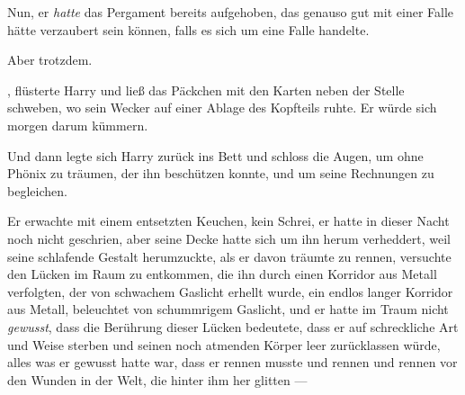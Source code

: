 Nun, er \emph{hatte} das Pergament bereits aufgehoben, das genauso gut mit einer Falle hätte verzaubert sein können, falls es sich um eine Falle handelte.

Aber trotzdem.

, flüsterte Harry und ließ das Päckchen mit den Karten neben der Stelle schweben, wo sein Wecker auf einer Ablage des Kopfteils ruhte. Er würde sich morgen darum kümmern.

Und dann legte sich Harry zurück ins Bett und schloss die Augen, um ohne Phönix zu träumen, der ihn beschützen konnte, und um seine Rechnungen zu begleichen.

\later

Er erwachte mit einem entsetzten Keuchen, kein Schrei, er hatte in dieser Nacht noch nicht geschrien, aber seine Decke hatte sich um ihn herum verheddert, weil seine schlafende Gestalt herumzuckte, als er davon träumte zu rennen, versuchte den Lücken im Raum zu entkommen, die ihn durch einen Korridor aus Metall verfolgten, der von schwachem Gaslicht erhellt wurde, ein endlos langer Korridor aus Metall, beleuchtet von schummrigem Gaslicht, und er hatte im Traum nicht \emph{gewusst}, dass die Berührung dieser Lücken bedeutete, dass er auf schreckliche Art und Weise sterben und seinen noch atmenden Körper leer zurücklassen würde, alles was er gewusst hatte war, dass er rennen musste und rennen und rennen vor den Wunden in der Welt, die hinter ihm her glitten —

